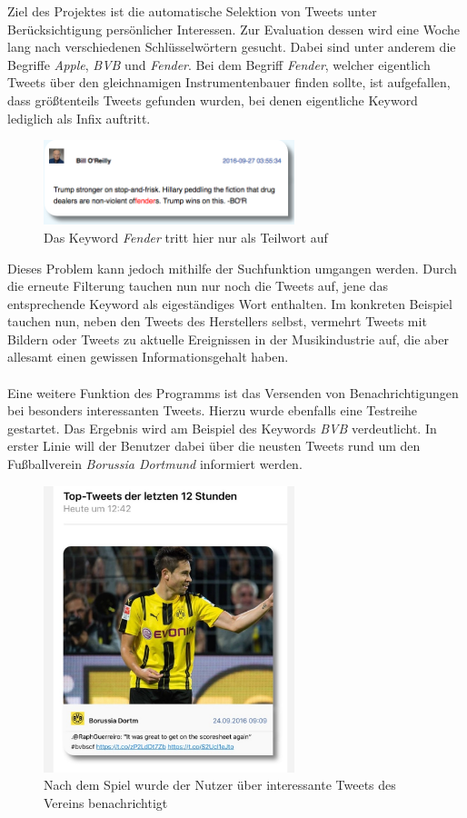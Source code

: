 Ziel des Projektes ist die automatische Selektion von Tweets unter Berücksichtigung persönlicher Interessen. Zur Evaluation dessen wird eine Woche lang nach verschiedenen Schlüsselwörtern gesucht. Dabei sind unter anderem die Begriffe \textit{Apple}, \textit{BVB} und \textit{Fender}. Bei dem Begriff \textit{Fender}, welcher eigentlich Tweets über den gleichnamigen Instrumentenbauer finden sollte, ist aufgefallen, dass größtenteils Tweets gefunden wurden, bei denen eigentliche Keyword lediglich als Infix auftritt.
%
\medskip
\begin{figure}[!h]
    \centering
    \includegraphics[width=0.65\textwidth]{Graphics/tweet_infix}
    \caption[Tweet: Schlüsselwort als Infix]{Das Keyword \textit{Fender} tritt hier nur als Teilwort auf}
   \label{fig:tweet_infix}
\end{figure}
%
Dieses Problem kann jedoch mithilfe der Suchfunktion umgangen werden. Durch die erneute Filterung tauchen nun nur noch die Tweets auf, jene das entsprechende Keyword als eigeständiges Wort enthalten. Im konkreten Beispiel tauchen nun, neben den Tweets des Herstellers selbst, vermehrt Tweets mit Bildern oder Tweets zu aktuelle Ereignissen in der Musikindustrie auf, die aber allesamt einen gewissen Informationsgehalt haben.
\\\\
Eine weitere Funktion des Programms ist das Versenden von Benachrichtigungen bei besonders interessanten Tweets. Hierzu wurde ebenfalls eine Testreihe gestartet. Das Ergebnis wird am Beispiel des Keywords \textit{BVB} verdeutlicht. In erster Linie will der Benutzer dabei über die neusten Tweets rund um den Fußballverein \textit{Borussia Dortmund} informiert werden. 
%
\medskip
\begin{figure}[!h]
    \centering
    \includegraphics[width=0.65\textwidth]{Graphics/bvb_notification}
    \caption[E-Mail Benachrichtigung am Beispiel \textit{BVB}]{Nach dem Spiel wurde der Nutzer über interessante Tweets des Vereins benachrichtigt}
   \label{fig:bvb_notifications}
\end{figure}
